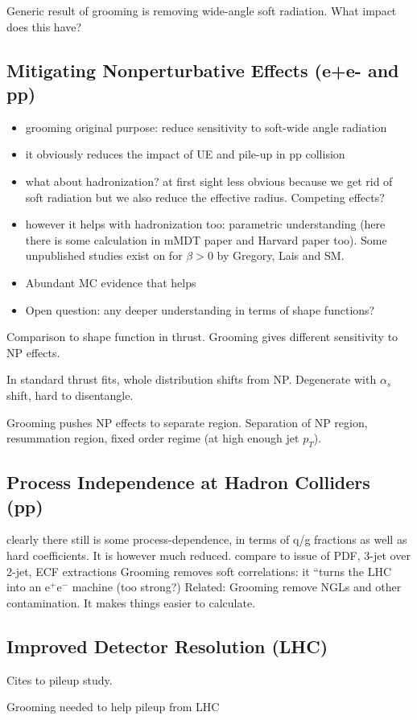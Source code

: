 

Generic result of grooming is removing wide-angle soft radiation.  What impact does this have?

\subsection{Mitigating Nonperturbative Effects (e+e- and pp)}

\begin{itemize}
\item grooming original purpose: reduce sensitivity to soft-wide angle radiation
\item it obviously reduces the impact of UE and pile-up in pp collision
\item what about hadronization? at first sight less obvious because we get rid of soft radiation but we also reduce the effective radius. Competing effects?
\item however it helps with hadronization too: parametric understanding (here there is some calculation in mMDT paper and Harvard paper too). Some unpublished studies exist on  for $\beta>0$ by Gregory, Lais and SM. 
\item Abundant MC evidence that helps
\item Open question: any deeper understanding in terms of shape functions?
\end{itemize}

Comparison to shape function in thrust.  Grooming gives different sensitivity to NP effects.

In standard thrust fits, whole distribution shifts from NP.  Degenerate with $\alpha_s$ shift, hard to disentangle.

Grooming pushes NP effects to separate region.  Separation of NP region, resummation region, fixed order regime (at high enough jet $p_T$).

\subsection{Process Independence at Hadron Colliders (pp)}
clearly there still is some process-dependence, in terms of q/g fractions as well as hard coefficients. It is however much reduced.
compare to issue of PDF, 3-jet over 2-jet, ECF extractions
Grooming removes soft correlations: it ``turns the LHC into an e$^+$e$^-$ machine (too strong?)
Related:  Grooming remove NGLs and other contamination. It makes things easier to calculate. 


\subsection{Improved Detector Resolution (LHC)}

Cites to pileup study.

Grooming needed to help pileup from LHC

